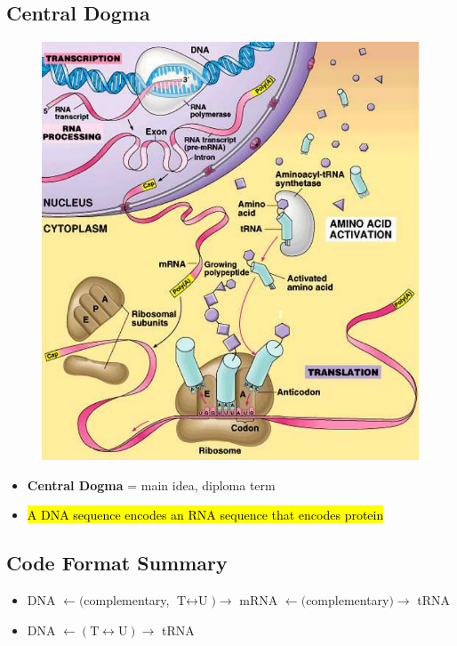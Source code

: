 \documentclass[a4paper,12pt]{article}
\begin{document}
\subsection{Central Dogma}
\begin{figure}[H]
    \centering
    \includegraphics[width=\textwidth]{dogma}
\end{figure}

\begin{itemize}
    \item{\textbf{Central Dogma} = main idea, diploma term}
    \item{\hl{A DNA sequence encodes an RNA sequence that encodes protein}}
\end{itemize}

\subsection{Code Format Summary}
\begin{itemize}
    \item{DNA $\longleftarrow\!\!($complementary, $\textrm{T} \longleftrightarrow \textrm{U}$$)\!\!\longrightarrow$ mRNA $\longleftarrow\!\!($complementary$)\!\!\longrightarrow$ tRNA}
    \item{DNA $\longleftarrow\!\!(\textrm{T} \longleftrightarrow \textrm{U})\!\!\longrightarrow$ tRNA}
\end{itemize}
\end{document}
